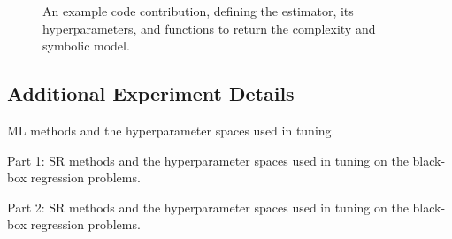 \begin{figure}
	
    \caption{
        An example code contribution, defining the estimator, its hyperparameters, and functions to return the complexity and symbolic model.
    }\label{fig:ex_code} 
\end{figure}

\subsection{Additional Experiment Details}




\begin{table}
    \footnotesize
    \centering

    \caption{
        ML methods and the hyperparameter spaces used in tuning.
    }
    
    
\end{table}

\begin{table}
    \footnotesize
    \centering
    \caption{
        Part 1: SR methods and the hyperparameter spaces used in tuning on the black-box regression problems.
    }
    
\end{table}

\begin{table}
    \scriptsize

    \centering

    \caption{
        Part 2: SR methods and the hyperparameter spaces used in tuning on the black-box regression problems.
    }
    
\end{table}
